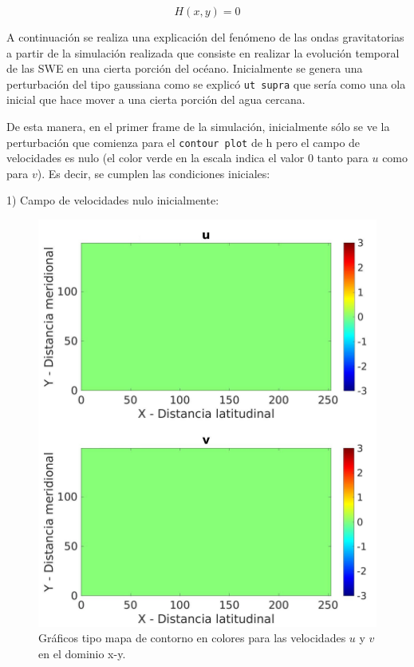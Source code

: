 \documentclass[12pt,dvipsnames]{exam}
\begin{document}
\begin{equation*}
    H(x,y) = 0
\end{equation*}

A continuación se realiza una explicación del fenómeno de las ondas gravitatorias a partir de la simulación realizada que consiste en realizar la evolución temporal de las SWE en una cierta porción del océano. Inicialmente se genera una perturbación del tipo gaussiana como se explicó \texttt{ut supra} que sería como una ola inicial que hace mover a una cierta porción del agua cercana.

De esta manera, en el primer frame de la simulación, inicialmente sólo se ve la perturbación que comienza para el \texttt{contour plot} de h pero el campo de velocidades es nulo (el color verde en la escala indica el valor 0 tanto para $u$ como para $v$). Es decir, se cumplen las condiciones iniciales: 


1) Campo de velocidades nulo inicialmente:

\begin{figure}[H]
\centering
\includegraphics[scale=0.4]{uv0.jpeg}
\caption{Gráficos tipo mapa de contorno en colores para las velocidades $u$ y $v$ en el dominio x-y.}
\end{figure}
\end{document}
